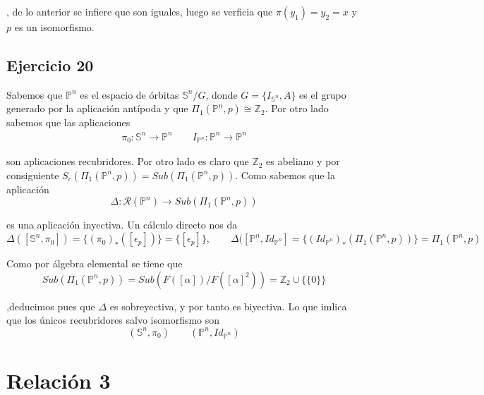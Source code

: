 \documentclass{article}
\begin{document}
, de lo anterior se infiere que son iguales, luego se verficia que $\pi(y_1)=y_2=x$ y $p$ es un isomorfismo. 

\subsection{Ejercicio 20}
Sabemos que $\mathbb{P}^n$ es el espacio de órbitas $\mathbb{S}^n/G$, donde $G=\{I_{\mathbb{S}^n},A\}$ es el grupo generado por la aplicación antípoda y que $\Pi_1(\mathbb{P}^n,p)\cong \mathbb{Z}_2$. Por otro lado sabemos que las aplicaciones
\begin{gather*}
\pi_0:\mathbb{S}^n\rightarrow \mathbb{P}^n\qquad I_{\mathbb{P}^n}:\mathbb{P}^n\rightarrow \mathbb{P}^n
\end{gather*}

son aplicaciones recubridores. Por otro lado es claro que $\mathbb{Z}_2$ es abeliano y por consiguiente $S_c(\Pi_1(\mathbb{P}^n,p))=Sub(\Pi_1(\mathbb{P}^n,p))$. Como sabemos que la aplicación 
\begin{equation*}
\Delta:\mathcal{R}(\mathbb{P}^n)\rightarrow Sub(\Pi_1(\mathbb{P}^n,p))
\end{equation*}

es una aplicación inyectiva. Un cálculo directo nos da
\begin{equation*}
\Delta([\mathbb{S}^n,\pi_0])=\{(\pi_0)_*([\epsilon_p])\}=\{[\epsilon_p]\},\qquad \Delta([\mathbb{P}^n,Id_{\mathbb{P}^n}]=\{(Id_{\mathbb{P}^n})_*(\Pi_1(\mathbb{P}^n,p))\}=\Pi_1(\mathbb{P}^n,p)
\end{equation*}

Como por álgebra elemental se tiene que
\begin{equation*}
Sub(\Pi_1(\mathbb{P}^n,p))=Sub(F([\alpha])/F([\alpha]^2))=\mathbb{Z}_2\cup \{\{0\}\}
\end{equation*}

,deducimos pues que $\Delta$ es sobreyectiva, y por tanto es biyectiva. Lo que imlica que los únicos recubridores salvo isomorfismo son
\begin{equation*}
(\mathbb{S}^n,\pi_0)\qquad (\mathbb{P}^n,Id_{\mathbb{P}^n})
\end{equation*}


\section{Relación 3}
\end{document}

